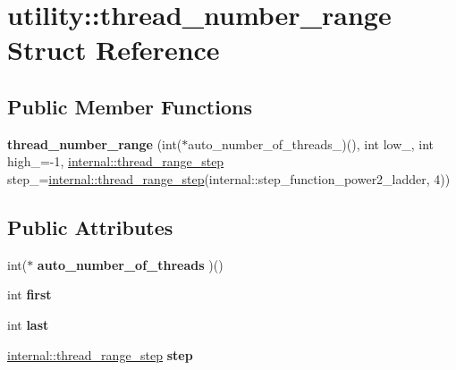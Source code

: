 \hypertarget{structutility_1_1thread__number__range}{}\section{utility\+:\+:thread\+\_\+number\+\_\+range Struct Reference}
\label{structutility_1_1thread__number__range}
\subsection*{Public Member Functions}
\begin{DoxyCompactItemize}
\item 
\hypertarget{structutility_1_1thread__number__range_a60ee4711d5d5b28e30a1174ac69c854f}{}{\bfseries thread\+\_\+number\+\_\+range} (int($\ast$auto\+\_\+number\+\_\+of\+\_\+threads\+\_\+)(), int low\+\_, int high\+\_\+=-\/1, \hyperlink{structutility_1_1internal_1_1thread__range__step}{internal\+::thread\+\_\+range\+\_\+step} step\+\_\+=\hyperlink{structutility_1_1internal_1_1thread__range__step}{internal\+::thread\+\_\+range\+\_\+step}(internal\+::step\+\_\+function\+\_\+power2\+\_\+ladder, 4))\label{structutility_1_1thread__number__range_a60ee4711d5d5b28e30a1174ac69c854f}

\end{DoxyCompactItemize}
\subsection*{Public Attributes}
\begin{DoxyCompactItemize}
\item 
\hypertarget{structutility_1_1thread__number__range_a8a54d3f3137311b064b71e291347453e}{}int($\ast$ {\bfseries auto\+\_\+number\+\_\+of\+\_\+threads} )()\label{structutility_1_1thread__number__range_a8a54d3f3137311b064b71e291347453e}

\item 
\hypertarget{structutility_1_1thread__number__range_a816791e01e98597ec1e5f6856e5bd540}{}int {\bfseries first}\label{structutility_1_1thread__number__range_a816791e01e98597ec1e5f6856e5bd540}

\item 
\hypertarget{structutility_1_1thread__number__range_af91460ff2be53ca1da029775ccd076a7}{}int {\bfseries last}\label{structutility_1_1thread__number__range_af91460ff2be53ca1da029775ccd076a7}

\item 
\hypertarget{structutility_1_1thread__number__range_a5e05c64720159f9984aaf19732e79ff7}{}\hyperlink{structutility_1_1internal_1_1thread__range__step}{internal\+::thread\+\_\+range\+\_\+step} {\bfseries step}\label{structutility_1_1thread__number__range_a5e05c64720159f9984aaf19732e79ff7}

\end{DoxyCompactItemize}
